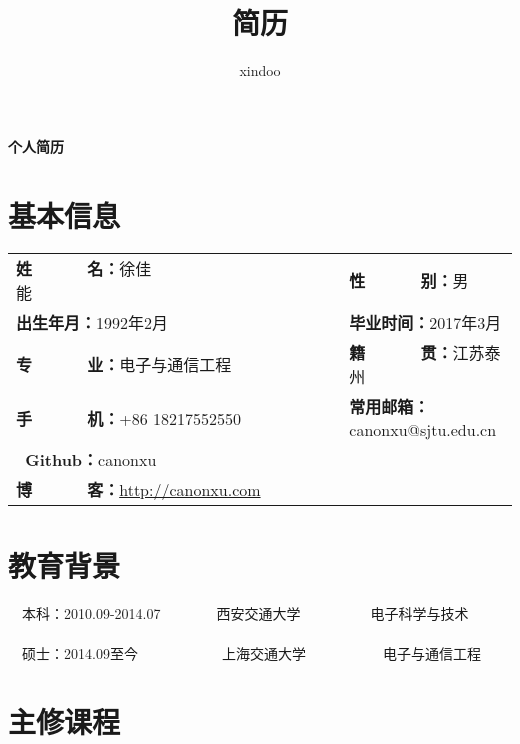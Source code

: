 \documentclass[12pt,a4paer]{article}
\title{简历}
\author{xindoo}
\begin{document}
\begin{CJK}{UTF8}{gbsn}  %
\begin{center}
{\LARGE \textbf{个人简历}}
\end{center}

\section*{{\large 基本信息}}
\vspace{-1.8em}
\begin{table}[!hbp]
 \begin{tabular}{ll}  %
  \textbf{姓~~~~~~名：}徐佳能~~~~~~~~~~~~~~~~~~~~~~~~~~~~~~~~~~~~&\textbf{性~~~~~~别：}男\\
   \textbf{出生年月：}1992年2月&\textbf{毕业时间：}2017年3月\\
    \textbf{专~~~~~~业：}电子与通信工程&\textbf{籍~~~~~~贯：}江苏泰州\\ 
     \textbf{手~~~~~~机：}+86 18217552550&\textbf{常用邮箱：}canonxu@sjtu.edu.cn\\
      \textbf{~Github：}canonxu\\
	   \textbf{博~~~~~~客：}\url{http://canonxu.com}   
	   
 \end{tabular}
\end{table}
\vspace{-3.3em}
\section*{{\large 教育背景}}
\vspace{-1.0em}
 \paragraph{}\textbf{\textbullet}~~本科：2010.09-2014.07~~~~~~~~西安交通大学~~~~~~~~~~电子科学与技术\vspace{-1.5em}
  \paragraph{}\textbf{\textbullet}~~硕士：2014.09至今~~~~~~~~~~~~上海交通大学~~~~~~~~~~~电子与通信工程\vspace{-1.8em}
\section*{{\large 主修课程}}
 \vspace{-0.8em}

\end{CJK}
\end{document}
